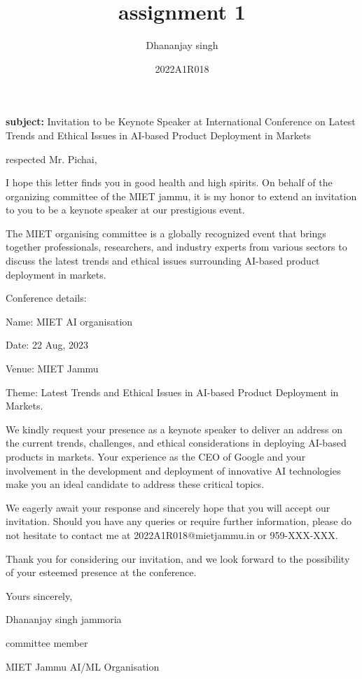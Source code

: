 \documentclass{article}
\title{assignment 1}
\author{Dhananjay singh}
\date{2022A1R018}
\begin{document}
\maketitle

 \textbf{subject:} Invitation to be Keynote Speaker at International Conference on Latest Trends and Ethical Issues in AI-based Product Deployment in Markets

 respected Mr. Pichai,

 I hope this letter finds you in good health and high spirits. On behalf of the organizing committee of the MIET jammu, it is my honor to extend an invitation to you to be a keynote speaker at our prestigious event.

 The MIET organising committee is a globally recognized event that brings together professionals, researchers, and industry experts from various sectors to discuss the latest trends and ethical issues surrounding AI-based product deployment in markets.


      Conference details:


    Name: MIET AI organisation

    
    Date: 22 Aug, 2023

    
    Venue: MIET Jammu

    
    Theme: Latest Trends and Ethical Issues in AI-based Product Deployment in Markets.

    We kindly request your presence as a keynote speaker to deliver an address on the current trends, challenges, and ethical considerations in deploying AI-based products in markets. Your experience as the CEO of Google and your involvement in the development and deployment of innovative AI technologies make you an ideal candidate to address these critical topics.

    We eagerly await your response and sincerely hope that you will accept our invitation. Should you have any queries or require further information, please do not hesitate to contact me at 2022A1R018@mietjammu.in or 959-XXX-XXX.

    Thank you for considering our invitation, and we look forward to the possibility of your esteemed presence at the conference.

Yours sincerely,

Dhananjay singh jammoria


committee member


MIET Jammu AI/ML Organisation
\end{document}
